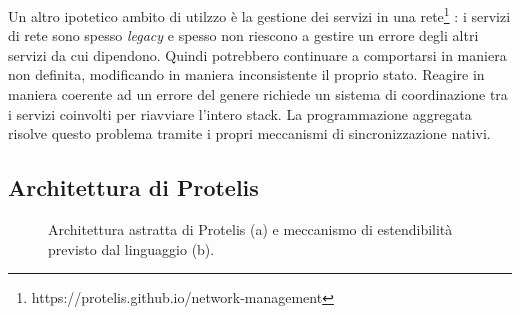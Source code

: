 Un altro ipotetico ambito di utilzzo è la gestione dei servizi in una
rete\footnote{https://protelis.github.io/network-management} \cite{Protelis}: i
servizi di rete sono spesso \textit{legacy} e spesso non riescono a gestire un
errore degli altri servizi da cui dipendono. Quindi potrebbero continuare a
comportarsi in maniera non definita, modificando in maniera inconsistente il
proprio stato. Reagire in maniera coerente ad un errore del genere richiede un
sistema di coordinazione tra i servizi coinvolti per riavviare l'intero
stack. La programmazione aggregata risolve questo problema tramite i propri
meccanismi di sincronizzazione nativi.

\subsection{Architettura di Protelis}\label{subsec:Architettura di Protelis}
\begin{figure}
  \hfill
  \caption{Architettura astratta di Protelis (a) e meccanismo di estendibilità
    previsto dal linguaggio (b).}
\end{figure}

